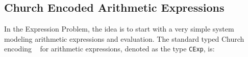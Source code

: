 \begin{comment}
Oliveira and Cook~\cite{oliveira2012extensibility} proposed a design pattern that can solve the
Expression Problem in languages like Java. An advantage of the pattern
over previous solutions is that it is relatively lightweight in terms
of type system features. In a latter paper, Oliveira et al.~\cite{oliveira2013feature}
noted some limitations of the original design pattern and proposed
some new techniques that generalized the original pattern, allowing it
to express programs in a Feature-Oriented Programming~\cite{Prehofer97} style.
Key to these techniques was the ability to dynamically compose object
algebras.

Unfortunatelly, dynamic composition of object algebras is
non-trivial. At the type-level it is possible to express the resulting
type of the composition using intersection types. Thus, it is still
possible to solve that part problem nicely in a language like Scala (which
has basic support for intersection types). However, the dynamic
composition itself cannot be easily encoded in Scala. The fundamental
issue is that Scala lacks a \lstinline{merge} operator (see the
discussion in Section~\ref{subsec:interScala}). Although both Oliveira et al.~\cite{oliveira2013feature} and
Rendell et al.~\cite{rendel14attributes} have shown that such a \lstinline{merge} operator can
be encoded in Scala, the encoding fundamentally relies in low-level
programming techniques such as dynamic proxies, reflection or
meta-programming.

Because \name supports a \lstinline{merge} operator natively, dynamic
object algebra composition becomes easy to encode. The remainder of
this section shows how object algebras and object algebra composition
can be encoded in \name. We will illustrate this point
step-by-step by solving the Expression Problem.
\end{comment}


\subsection{Church Encoded Arithmetic Expressions}
In the Expression Problem, the idea is to start with a very simple
system modeling arithmetic expressions and evaluation.
The standard typed Church encoding ~\cite{} for arithmetic expressions,
denoted as the type \lstinline{CExp}, is:

